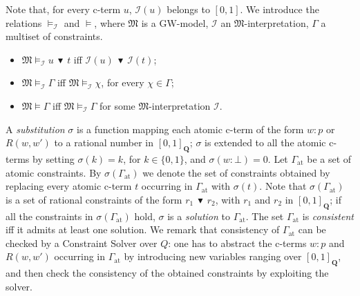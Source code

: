 \documentclass[copyright,creativecommons]{eptcs}
\newcommand{\GWM}{\mbox{$\mathrm{GW}$}}
\newcommand{\Qrange}{[0,1]_{\mathbf{Q}}}
\newcommand{\Gat}{\G_\mathrm{at}}
\newcommand{\abstractorder}{\,\blacktriangledown\,}%
\newcommand{\M}{\mathfrak{M}}
\newcommand{\s}{\sigma}
\newcommand{\G}{\Gamma}
\newcommand{\Ical}{\mathcal{I}}
\begin{document}
Note that, for every c-term $u$, $\Ical(u)$ belongs to $[0,1]$.
 We introduce the relations
$\models_\Ical$ and $\models$, where $\M$ is a \GWM-model, $\Ical$ an
$\M$-interpretation, $\Gamma$ a multiset of constraints.
\begin{itemize}
\item $\M\models_\Ical u \abstractorder t$ iff   $\Ical(u)  \abstractorder \Ical(t)$;
  
\item $\M\models_\Ical \Gamma$ iff $\M\models_\Ical\chi$, for every
  $\chi\in\Gamma$;

\item $\M\models \Gamma$ iff $\M\models_\Ical \Gamma$ for some
  $\M$-interpretation $\Ical$.
\end{itemize}
A \emph{substitution} $\s$ is a function mapping each atomic c-term of
the form $w : p$ or $R(w,w')$ to a rational number in $\Qrange$; $\s$
is extended to all the atomic c-terms by setting $\s(k)=k$, for
$k\in\{0,1\}$, and $\s(w:\bot)=0$.  Let $\Gat$ be a set of atomic
constraints.  By $\s(\Gat)$ we denote the set of constraints obtained
by replacing every atomic c-term $t$ occurring in $\Gat$ with $\s(t)$.
Note that $\s(\Gat)$ is a set of rational constraints of the form $r_1
\abstractorder r_2$, with $r_1$ and $r_2$ in $\Qrange$; if all the
constraints in $\s(\Gat)$ hold, $\s$ is a \emph{solution} to $\Gat$.
The set $\Gat$ is \emph{consistent} iff it admits at least one
solution.  We remark that consistency of $\Gat$ can be checked by a
Constraint Solver over $Q$: one has to abstract the c-terms $w : p$
and $R(w,w')$ occurring in $\Gat$ by introducing new variables ranging
over $\Qrange$, and then check the consistency of the obtained
constraints by exploiting the solver.
\end{document}
